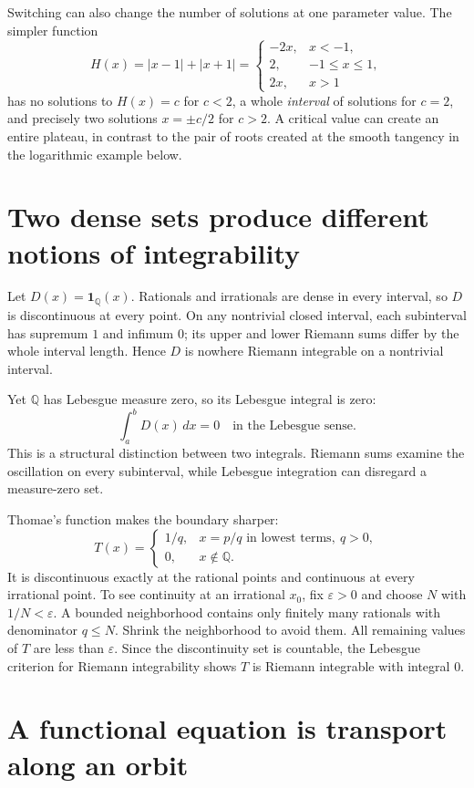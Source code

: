 Switching can also change the number of solutions at one parameter value. The simpler function
\[
 H(x)=|x-1|+|x+1|=
 \begin{cases}
 -2x,&x<-1,\\
 2,&-1\le x\le1,\\
 2x,&x>1
 \end{cases}
\]
has no solutions to $H(x)=c$ for $c<2$, a whole \emph{interval} of solutions for $c=2$, and precisely two solutions $x=\pm c/2$ for $c>2$. A critical value can create an entire plateau, in contrast to the pair of roots created at the smooth tangency in the logarithmic example below.

\section{Two dense sets produce different notions of integrability}

Let \(D(x)=\mathbf1_{\mathbb Q}(x)\). Rationals and irrationals are dense in every interval, so \(D\) is discontinuous at every point. On any nontrivial closed interval, each subinterval has supremum \(1\) and infimum \(0\); its upper and lower Riemann sums differ by the whole interval length. Hence \(D\) is nowhere Riemann integrable on a nontrivial interval.

Yet \(\mathbb Q\) has Lebesgue measure zero, so its Lebesgue integral is zero:
\[
 \int_a^bD(x)\,dx=0
 \quad\text{in the Lebesgue sense}.
\]
This is a structural distinction between two integrals. Riemann sums examine the oscillation on every subinterval, while Lebesgue integration can disregard a measure-zero set.

Thomae's function makes the boundary sharper:
\[
 T(x)=
 \begin{cases}
 1/q,&x=p/q\text{ in lowest terms},\ q>0,\\
 0,&x\notin\mathbb Q.
 \end{cases}
\]
It is discontinuous exactly at the rational points and continuous at every irrational point. To see continuity at an irrational \(x_0\), fix \(\varepsilon>0\) and choose \(N\) with \(1/N<\varepsilon\). A bounded neighborhood contains only finitely many rationals with denominator \(q\le N\). Shrink the neighborhood to avoid them. All remaining values of \(T\) are less than \(\varepsilon\). Since the discontinuity set is countable, the Lebesgue criterion for Riemann integrability shows \(T\) is Riemann integrable with integral \(0\).

\section{A functional equation is transport along an orbit}

